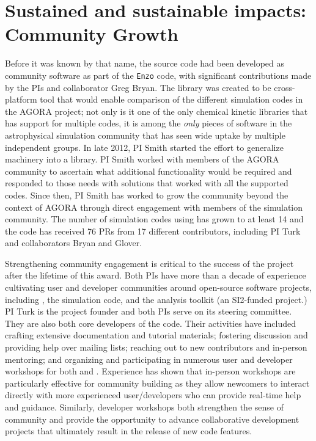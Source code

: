 \section{Sustained and sustainable impacts: Community Growth}\label{sec:community_growth}

Before it was known by that name, the \grackle{} source code had
been developed as community software as part of the \texttt{Enzo}
code, with significant contributions made by the PIs and collaborator
Greg Bryan.  The \grackle{} library was created to be cross-platform
tool that would enable comparison of the
different simulation codes in the AGORA project; not only is it one of the only
chemical kinetic libraries that has support for multiple codes, it is among the
\textit{only} pieces of software in the astrophysical simulation community that
has seen wide uptake by multiple independent groups.  In late 2012, PI
Smith started the effort to generalize  machinery into a library.
PI Smith worked with members of
the AGORA community to ascertain what additional functionality would be
required and responded to those needs with solutions that worked with
all the supported codes.  Since then, PI Smith has worked to grow the
\grackle{} community beyond the context of AGORA through direct
engagement with members of the simulation community.  The number of
simulation codes using \grackle{} has grown to at least 14 and the
code has received 76 PRs from 17 different contributors, including PI
Turk and collaborators Bryan and Glover.

Strengthening community engagement is critical to the success of the
\grackle{} project after the lifetime of this award.  Both PIs
have more than a decade of experience cultivating user and developer
communities around open-source software projects, including
\grackle{}, the \enzo{} simulation code, and the \yt{} analysis
toolkit (an SI2-funded project.)  PI Turk is the \yt{} project founder
and both PIs serve on its steering committee.  They are also both core
developers of the \enzo{} code.  Their activities have included
crafting extensive documentation and tutorial materials; fostering
discussion and providing help over mailing lists; reaching out to new
contributors and in-person mentoring; and organizing and participating
in numerous user and developer workshops for both \enzo{} and \yt{}.
Experience has shown that in-person workshops are particularly
effective for community building as they allow newcomers to interact
directly with more experienced user/developers who can provide
real-time help and guidance.  Similarly, developer workshops both
strengthen the sense of community and provide the opportunity to
advance collaborative development projects that ultimately result in
the release of new code features.

